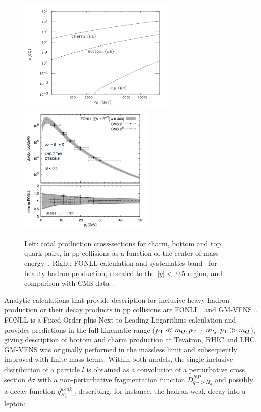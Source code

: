 \begin{figure}[!ht]
  \centering
  \includegraphics[width=7.6cm]{FigCap2/HQxsecPPcoll.png}
      \includegraphics[width=6.4cm]{FigCap2/FONLLBmeson.png}
  \caption{Left: total production cross-sections for charm, bottom and top quark pairs, in pp collisions as a function of the center-of-mass energy~\cite{Mangano:1997ri}. Right: FONLL calculation and systematics band~\cite{Cacciari:2012ny} for beauty-hadron production, rescaled to the $|y| <$ 0.5 region, and comparison with CMS data~\cite{Khachatryan:2011mk,Chatrchyan:2011pw}.}
  \label{fig:HQxsecPPcoll}
\end{figure}
Analytic calculations that provide description for inclusive heavy-hadron production or their decay products
in pp collisions are FONLL~\cite{Cacciari:1998it,Cacciari:2001td} and GM-VFNS~\cite{Kniehl:2004fy}. 
FONLL is a Fixed-Order plus Next-to-Leading-Logarithms 
calculation and provides predictions in the full kinematic range ($p_{\rm T} \ll m_Q, p_{\rm T} \sim m_Q, p_{\rm T} \gg m_Q$),
giving description of bottom and charm production at Tevatron, RHIC and LHC. 
GM-VFNS was originally performed in the massless limit and subsequently improved with finite mass terms.
Within both models, the single inclusive distribution of a particle $l$ is obtained as a convolution of a
perturbative cross section $d\sigma$ with a non-perturbative fragmentation function $D^{NP}_{q->H_q}$
and possibly a decay function $g^{weak}_{H_q \rightarrow l}$ describing, for instance, the hadron weak decay into a lepton:

